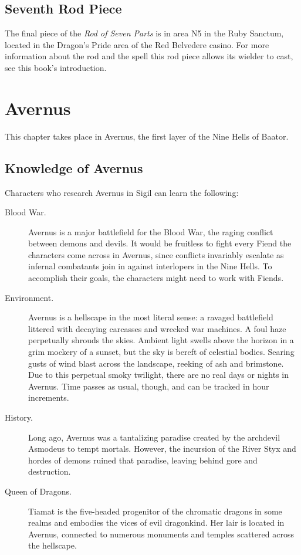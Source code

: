 \documentclass[10pt,a4paper,twoside,bg=print,twocolumn,openany,nodeprecatedcode]{dndbook}
\begin{document}
\subsection{Seventh Rod Piece}
The final piece of the \textit{Rod of Seven Parts} is in area N5 in the Ruby Sanctum, located in the Dragon's Pride area of the Red Belvedere casino. For more information about the rod and the spell this rod piece allows its wielder to cast, see this book's introduction.

\section{Avernus}
This chapter takes place in Avernus, the first layer of the Nine Hells of Baator.

\subsection{Knowledge of Avernus}
Characters who research Avernus in Sigil can learn the following:


\begin{description}
\item[Blood War.]
Avernus is a major battlefield for the Blood War, the raging conflict between demons and devils. It would be fruitless to fight every Fiend the characters come across in Avernus, since conflicts invariably escalate as infernal combatants join in against interlopers in the Nine Hells. To accomplish their goals, the characters might need to work with Fiends.
\item[Environment.]
Avernus is a hellscape in the most literal sense: a ravaged battlefield littered with decaying carcasses and wrecked war machines. A foul haze perpetually shrouds the skies. Ambient light swells above the horizon in a grim mockery of a sunset, but the sky is bereft of celestial bodies. Searing gusts of wind blast across the landscape, reeking of ash and brimstone. Due to this perpetual smoky twilight, there are no real days or nights in Avernus. Time passes as usual, though, and can be tracked in hour increments.
\item[History.]
Long ago, Avernus was a tantalizing paradise created by the archdevil Asmodeus to tempt mortals. However, the incursion of the River Styx and hordes of demons ruined that paradise, leaving behind gore and destruction.
\item[Queen of Dragons.]
Tiamat is the five-headed progenitor of the chromatic dragons in some realms and embodies the vices of evil dragonkind. Her lair is located in Avernus, connected to numerous monuments and temples scattered across the hellscape.
\end{description}
\end{document}
